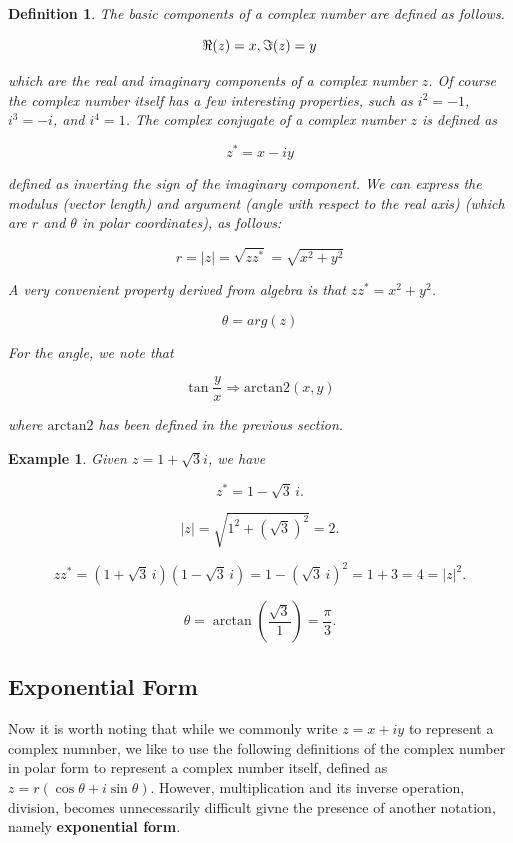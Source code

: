 \documentclass[12pt]{article}
\theoremstyle{plain}
\newtheorem{definition}[theorem]{Definition}
\newtheorem*{example}{Example}
\theoremstyle{definition}
\begin{document}
\begin{definition}
    The basic components of a complex number are defined as follows. 

    $$\real(z) = x, \imaginary(z) = y$$

    which are the real and imaginary components of a complex number $z$. Of course the complex number itself has a few interesting properties, such as $i^2 = -1$, $i^3 = -i$, and $i^4 = 1$. The complex conjugate of a complex number $z$ is defined as 

    $$z^* = x - iy$$

    defined as inverting the sign of the imaginary component. We can express the modulus (vector length) and argument (angle with respect to the real axis) (which are $r$ and $\theta$ in polar coordinates), as follows:

    $$r = \vert z \vert = \sqrt{zz^*} = \sqrt{x^2 + y^2}$$

    A very convenient property derived from algebra is that $zz^* = x^2 + y^2$.

    $$\theta = arg(z)$$

    For the angle, we note that

    $$\tan \frac{y}{x} \Longrightarrow \mathrm{arctan2}(x, y)$$

    where $\mathrm{arctan2}$ has been defined in the previous section. 
\end{definition}

\begin{example}
    Given $z = 1 + \sqrt{3}i$, we have

    $$z^* = 1-\sqrt{3}\,i.$$

    $$|z|=\sqrt{1^2+(\sqrt{3})^2}=2.$$

    $$zz^*=(1+\sqrt{3}\,i)(1-\sqrt{3}\,i)=1-(\sqrt{3}\,i)^2=1+3=4=|z|^2.$$

    $$\theta=\arctan\!\left(\dfrac{\sqrt{3}}{1}\right)=\dfrac{\pi}{3}.$$

\end{example}


\subsection{Exponential Form}

Now it is worth noting that while we commonly write $z = x + iy$ to represent a complex numnber, we like to use the following definitions of the complex number in polar form to represent a complex number itself, defined as $z = r (\cos \theta + i \sin \theta)$. However, multiplication and its inverse operation, division, becomes unnecessarily difficult givne the presence of another notation, namely \textbf{exponential form}. 
\end{document}

